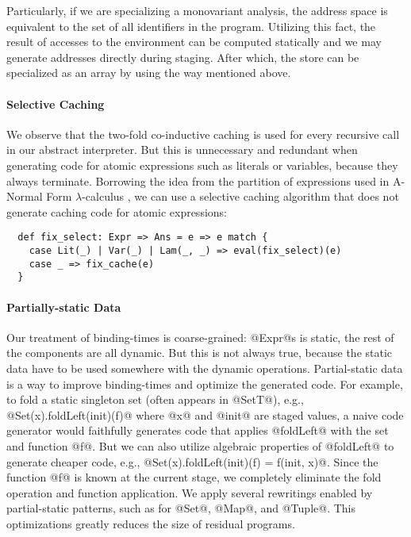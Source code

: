 Particularly, if we are specializing a monovariant analysis, the address space
is equivalent to the set of all identifiers in the program. Utilizing this fact, the
result of accesses to the environment can be computed statically and we may
generate addresses directly during staging. After which, the store can be
specialized as an array by using the way mentioned above.

\paragraph{Selective Caching} We observe that the two-fold co-inductive
caching is used for every recursive call in our abstract interpreter. But this
is unnecessary and redundant when generating code for atomic
expressions such as literals or variables, because they always terminate.
Borrowing the idea from the partition of expressions used in A-Normal Form
$\lambda$-calculus \cite{Flanagan:1993:ECC:155090.155113}, we can use a
selective caching algorithm that does not generate caching code for atomic
expressions:
\begin{lstlisting}
  def fix_select: Expr => Ans = e => e match {
    case Lit(_) | Var(_) | Lam(_, _) => eval(fix_select)(e)
    case _ => fix_cache(e)
  }
\end{lstlisting}

\paragraph{Partially-static Data}
Our treatment of binding-times is coarse-grained: @Expr@s is static, the rest
of the components are all dynamic. But this is not always true, because the
static data have to be used somewhere with the dynamic operations.
Partial-static data is a way to improve binding-times and optimize the
generated code.
For example, to fold a static singleton set (often appears in @SetT@), e.g.,
@Set(x).foldLeft(init)(f)@ where @x@ and @init@ are staged values, a naive code
generator would faithfully generates code that applies @foldLeft@ with the set
and function @f@. But we can also utilize algebraic properties of @foldLeft@
to generate cheaper code, e.g., @Set(x).foldLeft(init)(f) = f(init, x)@. Since the
function @f@ is known at the current stage, we completely eliminate the fold
operation and function application. We apply several rewritings enabled by
partial-static patterns, such as for @Set@, @Map@, and @Tuple@. This
optimizations greatly reduces the size of residual programs.

